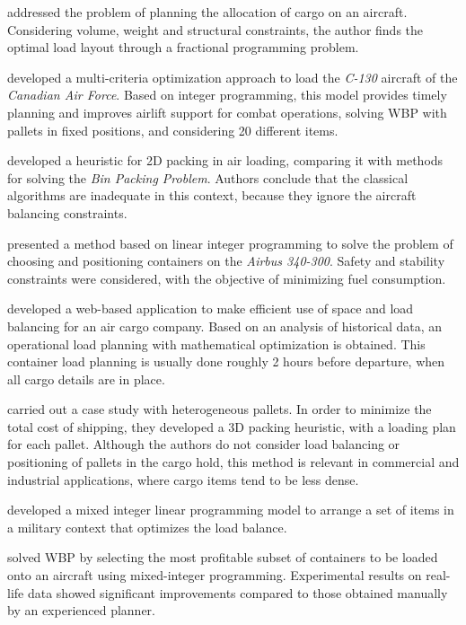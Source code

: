 \documentclass[preprint,authoryear]{elsarticle}
\begin{document}
\cite{Brosh1981} addressed the problem of planning the allocation of cargo on an aircraft. Considering volume, weight and structural constraints, the author finds the optimal load layout through a fractional programming problem.

\cite{Kevin1992} developed a multi-criteria optimization approach to load the {\it C-130} aircraft of the {\it Canadian Air Force}. Based on integer programming, this model provides timely planning and improves airlift support for combat operations, solving WBP with pallets in fixed positions, and considering 20 different items.

\cite{Heidelberg1998} developed a heuristic for 2D packing in air loading, comparing it with methods for solving the {\it Bin Packing Problem}. Authors conclude that the classical algorithms are inadequate in this context, because they ignore the aircraft balancing constraints.

\cite{MongeauBes2003} presented a method based on linear integer programming to solve the problem of choosing and positioning containers on the {\it Airbus 340-300}. Safety and stability constraints were considered, with the objective of minimizing fuel consumption.

\cite{fok2004optimizing} developed a web-based application to make efficient use of space and load balancing for an air cargo company. Based on an analysis of historical data, an operational load planning with mathematical optimization is obtained. This container load planning is usually done roughly 2 hours before departure, when all cargo details are in place.

\cite{Chan2006} carried out a case study with heterogeneous pallets. In order to minimize the total cost of shipping, they developed a 3D packing heuristic, with a loading plan for each pallet. Although the authors do not consider load balancing or positioning of pallets in the cargo hold, this method is relevant in commercial and industrial applications, where cargo items tend to be less dense.

\cite{KaluznyBohdanL2009Oalb} developed a mixed integer linear programming model to arrange a set of items in a military context that optimizes the load balance.

\cite{Verstichel2011} solved WBP by selecting the most profitable subset of containers to be loaded onto an aircraft using mixed-integer programming. Experimental results on real-life data showed significant improvements compared to those obtained manually by an experienced planner.
\end{document}
